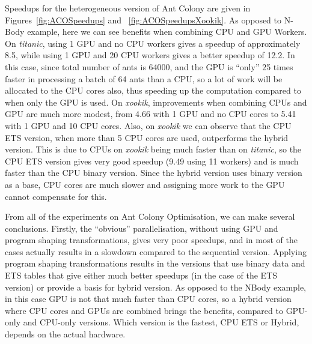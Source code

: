 \documentclass[final]{jfp1}
\begin{document}
Speedups for the heterogeneous
version of Ant Colony are given in Figures~\ref{fig:ACOSpeedups} and ~\ref{fig:ACOSpeedupsXookik}. 
As opposed to N-Body example, here we can see benefits when combining
CPU and GPU Workers. On \emph{titanic}, using 1 GPU and no CPU workers 
gives a speedup
of approximately 8.5, while using 1 GPU and 20 CPU workers gives a better 
speedup of 12.2. In this case, since total number of ants is 64000, and the
GPU is ``only'' 25 times faster in processing a batch of 64 ants than a CPU, so a lot of work will be allocated to the CPU cores also, thus speeding up the computation compared to
when only the GPU is used. On \emph{xookik}, improvements when combining 
CPUs and GPU are much more modest, from 4.66 with 1 GPU and no CPU cores to
5.41 with 1 GPU and 10 CPU cores. Also, on \emph{xookik} we can observe that
the CPU ETS version, when more than 5 CPU cores are used, outperforms the 
hybrid version. This is due to CPUs on \emph{xookik} being much faster
than on \emph{titanic}, so the CPU ETS version gives very good speedup 
(9.49 using 11 workers) and is much faster than the CPU binary version. 
Since the hybrid version uses binary version as a base, CPU cores
are much slower and assigning more work to the GPU cannot compensate for 
this.

From all of the experiments on Ant Colony Optimisation, we can make several
conclusions. Firstly, the ``obvious'' parallelisation, without using GPU
and program shaping transformations, gives very poor speedups, and in most
of the cases actually results in a slowdown compared to the sequential version.
Applying program shaping transformations results in the versions that
use binary data and ETS tables that give either much better speedups (in the 
case of the ETS version) or provide a basis for hybrid version. As opposed to 
the NBody example, in this case GPU is not that much faster than CPU cores, so
a hybrid version where CPU cores and GPUs are combined brings the benefits,
compared to GPU-only and CPU-only versions. Which version is the fastest,
CPU ETS or Hybrid, depends on the actual hardware. 

\end{document}
